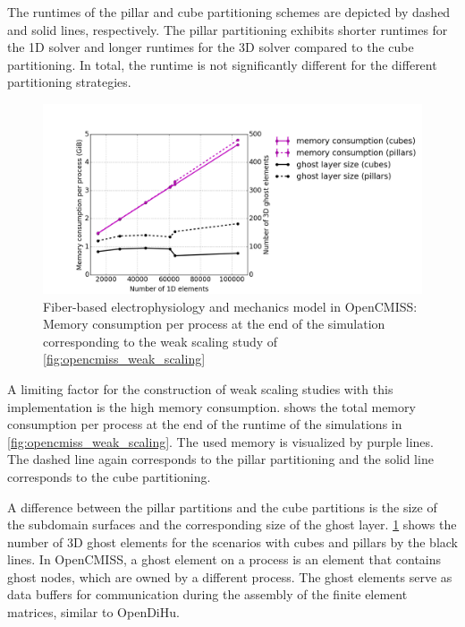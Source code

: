 The runtimes of the pillar and cube partitioning schemes are depicted by dashed and solid lines, respectively. The pillar partitioning exhibits shorter runtimes for the 1D solver and longer runtimes for the 3D solver compared to the cube partitioning. In total, the runtime is not significantly different for the different partitioning strategies.

\begin{figure}
  \centering%
  \includegraphics[width=\textwidth]{images/results/studies/opencmiss_memory.png}%
  \caption{Fiber-based electrophysiology and mechanics model in OpenCMISS: Memory consumption per process at the end of the simulation corresponding to the weak scaling study of \cref{fig:opencmiss_weak_scaling}} %
  \label{fig:opencmiss_memory}%
\end{figure}%

A limiting factor for the construction of weak scaling studies with this implementation is the high memory consumption.  shows the total memory consumption per process at the end of the runtime of the simulations in \cref{fig:opencmiss_weak_scaling}. The used memory is visualized by purple lines. The dashed line again corresponds to the pillar partitioning and the solid line corresponds to the cube partitioning. 

A difference between the pillar partitions and the cube partitions is the size of the subdomain surfaces and the corresponding size of the ghost layer. \cref{fig:opencmiss_memory} shows the number of 3D ghost elements for the scenarios with cubes and pillars by the black lines. In OpenCMISS, a ghost element on a process is an element that contains ghost nodes, which are owned by a different process. The ghost elements serve as data buffers for communication during the assembly of the finite element matrices, similar to OpenDiHu.

